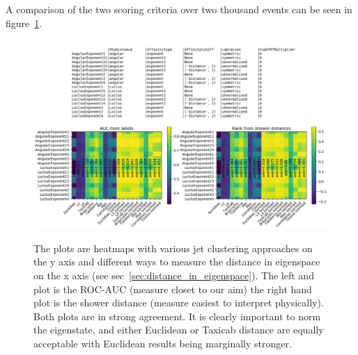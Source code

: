 A comparison of the two scoring criteria over two thousand events can be seen in figure~\ref{fig:eigenspace_distance_comparison}.
\begin{figure}[htp]
    \includegraphics[width=1.\textwidth]{graphics/eigenspace_distance_comparison}
    \label{fig:eigenspace_distance_comparison}
    \caption{
        The plots are heatmaps with various jet clustering approaches on
        the y axis and different ways to measure the distance in eigenspace on the
        x axis (see sec~\ref{sec:distance_in_eigenspace}).
        The left and plot is the ROC-AUC (measure closet to our aim)
        the right hand plot is the shower distance (measure easiest to interpret physically).
        Both plots are in strong agreement.
        It is clearly important to norm the eigenstate, and either Euclidean or Taxicab distance
        are equally acceptable with Euclidean results being marginally stronger.
             }
\end{figure}    

